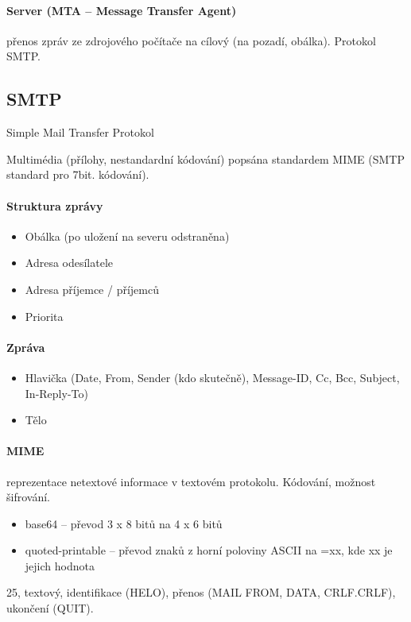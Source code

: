 \documentclass[a4wide]{report}
\begin{document}
\paragraph{Server (MTA -- Message Transfer Agent)} přenos zpráv ze zdrojového počítače na cílový (na pozadí, obálka). Protokol SMTP.

\subsection{SMTP} Simple Mail Transfer Protokol

Multimédia (přílohy, nestandardní kódování) popsána standardem MIME (SMTP standard pro 7bit. kódování).

\paragraph{Struktura zprávy}
\begin{itemize}
	\item Obálka (po uložení na severu odstraněna)
	\item Adresa odesílatele
	\item Adresa příjemce / příjemců
	\item Priorita
\end{itemize}

\paragraph{Zpráva}
\begin{itemize}
	\item Hlavička (Date, From, Sender (kdo skutečně), Message-ID, Cc, Bcc, Subject, In-Reply-To)
	\item Tělo
\end{itemize}

\paragraph{MIME} reprezentace netextové informace v textovém protokolu. Kódování, možnost šifrování.
\begin{itemize}
	\item base64 -- převod 3 x 8 bitů na 4 x 6 bitů
	\item quoted-printable -- převod znaků z horní poloviny ASCII na =xx, kde xx je jejich hodnota
\end{itemize}

25, textový, identifikace (HELO), přenos (MAIL FROM, DATA, CRLF.CRLF), ukončení (QUIT).
\end{document}
